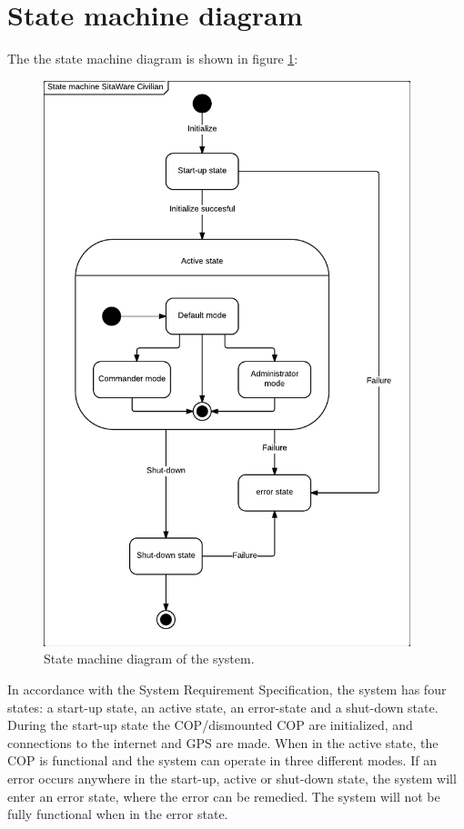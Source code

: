 \section{State machine diagram}
The the state machine diagram is shown in figure \ref{fig:state_diagram}:

\begin{figure}[H]
\centering
\includegraphics[width=0.95\textwidth]
{billeder/state_machine_pdd.pdf}
\caption{State machine diagram of the system.}
\label{fig:state_diagram}
\end{figure}

In accordance with the System Requirement Specification, the system has four states: a start-up state, an active state, an error-state and a shut-down state. During the start-up state the COP/dismounted COP are initialized, and connections to the internet and GPS are made. When in the active state, the COP is functional and the system can operate in three different modes. If an error occurs anywhere in the start-up, active or shut-down state, the system will enter an error state, where the error can be remedied. The system will not be fully functional when in the error state. 